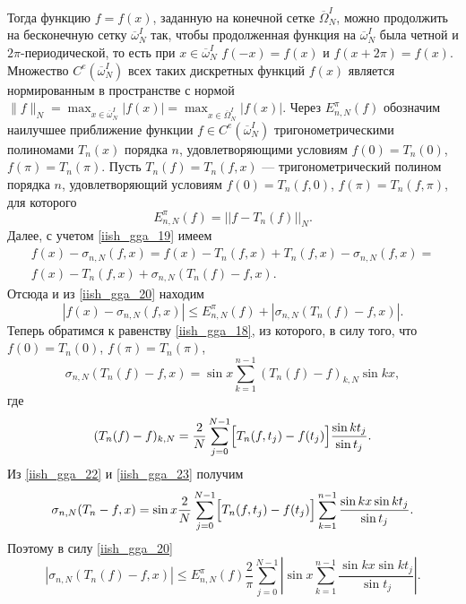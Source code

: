 Тогда функцию $f = f(x)$, заданную на конечной сетке $\overline{\Omega}_N^I$, можно продолжить на бесконечную сетку $\overline{\omega}_N^I$ так, чтобы продолженная функция
на $\overline{\omega}_N^I$ была четной и $2\pi$-периодической, то есть при $x \in \overline{\omega}_N^I$ $f(-x) = f(x)$ и $f(x + 2\pi) = f(x)$.
Множество $C^e(\overline{\omega}_N^I)$ всех таких дискретных функций $f(x)$ является нормированным в пространстве с нормой
$\|f\|_N = \max_{x \in \overline{\omega}_N^I} |f(x)| = \max_{x \in \overline{\Omega}_N^I} |f(x)|$.
Через $E_{n,N}^\pi (f)$ обозначим наилучшее приближение функции $f \in C^e(\overline{\omega}_N^I)$ тригонометрическими полиномами $T_n(x)$ порядка $n$,
удовлетворяющими условиям $f(0)=T_n(0)$, $f(\pi)=T_n(\pi)$. Пусть $T_n(f)=T_n(f,x)$ --- тригонометрический полином порядка $n$, удовлетворяющий
условиям $f(0)=T_n(f,0)$, $f(\pi)=T_n(f,\pi)$, для которого
\begin{equation}
  E_{n,N}^\pi(f) = ||f - T_n(f)||_N. \label{iish_gga_20}
\end{equation}
Далее, с учетом \eqref{iish_gga_19} имеем
\begin{multline*}
  f(x)-\sigma_{n,N}(f,x) = f(x) - T_n(f,x) + T_n(f,x) - \sigma_{n,N}(f,x) = \\
  f(x) - T_n(f,x) + \sigma_{n,N}(T_n(f) - f, x).
\end{multline*}
Отсюда и из \eqref{iish_gga_20} находим
\begin{equation}
  |f(x) - \sigma_{n,N}(f,x)| \leq E_{n,N}^\pi (f) + |\sigma_{n,N}(T_n(f) - f, x)|. \label{iish_gga_21}
\end{equation}
Теперь обратимся к равенству \eqref{iish_gga_18}, из которого, в силу того, что $f(0) = T_n(0)$, $f(\pi) = T_n(\pi)$,
\begin{equation}
  \sigma_{n,N} (T_n(f) - f, x) = \sin x \sum\limits_{k=1}^{n-1} (T_n(f) - f)_{k,N} \sin kx, \label{iish_gga_22}
\end{equation}
где
\begin{equation}
  (T_n(f) - f)_{k,N} = \frac2N \sum\limits_{j=0}^{N-1} \Bigl[T_n(f,t_j) - f(t_j)\Bigr]\frac{\sin kt_j}{\sin t_j}. \label{iish_gga_23}
\end{equation}
Из \eqref{iish_gga_22} и \eqref{iish_gga_23} получим
\begin{equation}
  \sigma_{n,N}(T_n - f, x) = \sin x \frac2N \sum\limits_{j=0}^{N-1} \Bigl[T_n(f, t_j) - f(t_j)\Bigr] \sum\limits_{k=1}^{n-1} \frac{\sin kx \sin kt_j}{\sin t_j}. \label{iish_gga_24}
\end{equation}
Поэтому в силу \eqref{iish_gga_20}
\begin{equation*}
  |\sigma_{n,N}(T_n(f) - f, x)| \leq E_{n,N}^\pi(f) \frac2\pi \sum\limits_{j=0}^{N-1} \left| \sin x \sum\limits_{k=1}^{n-1} \frac{\sin kx \sin kt_j}{\sin t_j} \right|.
\end{equation*}

